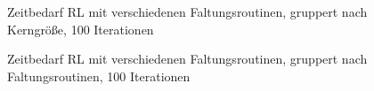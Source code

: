 \documentclass[a4paper,12pt]{article}
\begin{document}
\begin{figure}[htbp]
\caption{Zeitbedarf RL mit verschiedenen Faltungsroutinen, gruppert nach
Kerngröße, 100 Iterationen}%
\label{figure_zeit_rl}
\end{figure}
 
\begin{figure}[htbp]
\caption{Zeitbedarf RL mit verschiedenen Faltungsroutinen, gruppert nach
Faltungsroutinen, 100 Iterationen}%
\label{figure_zeit_rl_umgruppiert}
\end{figure}
\end{document}

